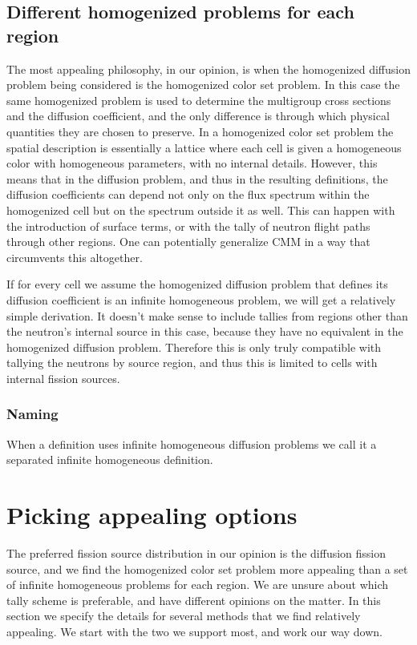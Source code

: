 \documentclass[a4paper,letterpaper,12pt,oneside,draft]{article}
\begin{document}
\subsection{Different homogenized problems for each region}
The most appealing philosophy, in our opinion, is when the homogenized diffusion problem being considered is the homogenized color set problem.
In this case the same homogenized problem is used to determine the multigroup cross sections and the diffusion coefficient, and the only difference is through which physical quantities they are chosen to preserve.
In a homogenized color set problem the spatial description is essentially a lattice where each cell is given a homogeneous color with homogeneous parameters, with no internal details.
However, this means that in the diffusion problem, and thus in the resulting definitions, the diffusion coefficients can depend not only on the flux spectrum within the homogenized cell but on the spectrum outside it as well.
This can happen with the introduction of surface terms, or with the tally of neutron flight paths through other regions.
One can potentially generalize CMM in a way that circumvents this altogether.

If for every cell we assume the homogenized diffusion problem that defines its diffusion coefficient is an infinite homogeneous problem, we will get a relatively simple derivation.
It doesn't make sense to include tallies from regions other than the neutron's internal source in this case, because they have no equivalent in the homogenized diffusion problem.
Therefore this is only truly compatible with tallying the neutrons by source region, and thus this is limited to cells with internal fission sources.

\subsubsection*{Naming}
When a definition uses infinite homogeneous diffusion problems we call it a separated infinite homogeneous definition.

\section{Picking appealing options}
The preferred fission source distribution in our opinion is the diffusion fission source, and we find the homogenized color set problem more appealing than a set of infinite homogeneous problems for each region. 
We are unsure about which tally scheme is preferable, and have different opinions on the matter.
In this section we specify the details for several methods that we find relatively appealing.
We start with the two we support most, and work our way down.
\end{document}

